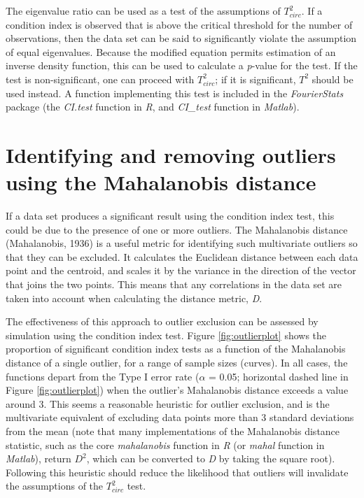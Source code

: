 \documentclass[]{article}
\begin{document}
The eigenvalue ratio can be used as a test of the assumptions of \(T^2_{circ}\). If a condition index is observed that is above the critical threshold for the number of observations, then the data set can be said to significantly violate the assumption of equal eigenvalues. Because the modified equation permits estimation of an inverse density function, this can be used to calculate a \emph{p}-value for the test. If the test is non-significant, one can proceed with \(T^2_{circ}\); if it is significant, \(T^2\) should be used instead. A function implementing this test is included in the \emph{FourierStats} package (the \emph{CI.test} function in \emph{R}, and \emph{CI\_test} function in \emph{Matlab}).

\hypertarget{identifying-and-removing-outliers-using-the-mahalanobis-distance}{%
\section{Identifying and removing outliers using the Mahalanobis distance}\label{identifying-and-removing-outliers-using-the-mahalanobis-distance}}

If a data set produces a significant result using the condition index test, this could be due to the presence of one or more outliers. The Mahalanobis distance (Mahalanobis, 1936) is a useful metric for identifying such multivariate outliers so that they can be excluded. It calculates the Euclidean distance between each data point and the centroid, and scales it by the variance in the direction of the vector that joins the two points. This means that any correlations in the data set are taken into account when calculating the distance metric, \emph{D}.

The effectiveness of this approach to outlier exclusion can be assessed by simulation using the condition index test. Figure \ref{fig:outlierplot} shows the proportion of significant condition index tests as a function of the Mahalanobis distance of a single outlier, for a range of sample sizes (curves). In all cases, the functions depart from the Type I error rate (\(\alpha\) = 0.05; horizontal dashed line in Figure \ref{fig:outlierplot}) when the outlier's Mahalanobis distance exceeds a value around 3. This seems a reasonable heuristic for outlier exclusion, and is the multivariate equivalent of excluding data points more than 3 standard deviations from the mean (note that many implementations of the Mahalanobis distance statistic, such as the core \emph{mahalanobis} function in \emph{R} (or \emph{mahal} function in \emph{Matlab}), return \(D^2\), which can be converted to \emph{D} by taking the square root). Following this heuristic should reduce the likelihood that outliers will invalidate the assumptions of the \(T^2_{circ}\) test.
\end{document}
